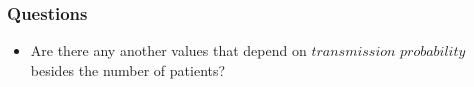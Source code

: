 \documentclass[aspectratio=169, 9pt, xcolor=table]{beamer}
\begin{document}
\begin{frame}
    \frametitle{Questions}
    
    \begin{itemize}
        \item Are there any another values that depend on $\textit{transmission probability}$ besides the number of patients?
        
    \end{itemize}
\end{frame}
        

        
\end{document}
